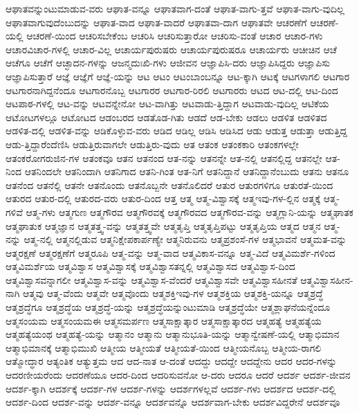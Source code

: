 {ಆಘಾತವನ್ನುಂಟುಮಾಡುವ-ವರು
ಆಘಾತ-ವನ್ನೂ
ಆಘಾತವಾಗ-ದಂತೆ
ಆಘಾತ-ವಾಗು-ತ್ತವೆ
ಆಘಾತ-ವಾಗು-ವುದಿಲ್ಲ
ಆಘಾತವಾಗುವುದೆಂಬುದನ್ನು
ಆಘಾತ-ವಾದ
ಆಘಾತ-ವಾದರೆ
ಆಘಾತವಾ-ದಾಗ
ಆಘಾತವೇ
ಆಚರಣೆಗೆ
ಆಚರಣೆ-ಯಲ್ಲಿ
ಆಚರಣೆ-ಯಿಂದ
ಆಚರಿಸಬೇಕೆಂಬ
ಆಚರಿಸಿ
ಆಚರಿಸುತ್ತಾರೋ
ಆಚರಿಸು-ವಂತೆ
ಆಚಾರ
ಆಚಾರ-ಗಳು
ಆಚಾರವಿಚಾರ-ಗಳಲ್ಲಿ
ಆಚಾರ-ವಿಲ್ಲ
ಆಚಾರ್ಯಪುರುಷರು
ಆಚಾರ್ಯಪುರುಷರೂ
ಆಚಾರ್ಯರು
ಆಚೀಚಿನ
ಆಚೆ
ಆಚೆಗೂ
ಆಚೆಗೆ
ಆಚ್ಛಾದನ-ಗಳನ್ನು
ಆಜನ್ಮದುಃಖಿ-ಗಳು
ಆಜೀವನ
ಆಜ್ಞಾಪಿಸಿ-ದರು
ಆಜ್ಞಾಪಿಸಿದ್ದರು
ಆಜ್ಞಾಪಿಸು
ಆಜ್ಞಾಪಿಸುತ್ತಾರೆ
ಆಜ್ಞೆ
ಆಜ್ಞೆಗೆ
ಆಜ್ಞೆ-ಯನ್ನು
ಆಟ
ಆಟಂ
ಆಟಂಬಾಂಬನ್ನೂ
ಆಟ-ಕ್ಕಾಗಿ
ಆಟಕ್ಕೆ
ಆಟಗಳಾಗಲಿ
ಆಟಗಾರ
ಆಟಗಾರನಾಗಿದ್ದನೆಂದೂ
ಆಟಗಾರನೊಬ್ಬ
ಆಟಗಾರರ
ಆಟಗಾರ-ರಿರಲಿ
ಆಟಗಾರರು
ಆಟದ
ಆಟ-ದಲ್ಲಿ
ಆಟ-ದಿಂದ
ಆಟಪಾಠ-ಗಳಲ್ಲಿ
ಆಟ-ವನ್ನು
ಆಟವನ್ನೇನೋ
ಆಟ-ವಾಗಿತ್ತು
ಆಟವಾಡು-ತ್ತಿದ್ದಾಗ
ಆಟವಾಡು-ವುದಿಲ್ಲ
ಆಟಿಕೆಯ
ಆಟೋಟಗಳಲ್ಲೂ
ಆಟೋಟದ
ಆಡಂಬರದ
ಆಡತೊಡ-ಗಿತು
ಆಡದೆ
ಆಡ-ಬೇಕು
ಆಡಲು
ಆಡಳಿತ
ಆಡಳಿತದ
ಆಡಳಿತ-ದಲ್ಲಿ
ಆಡಳಿತ-ವನ್ನು
ಆಡಿಕೊಳ್ಳುವ-ವರು
ಆಡಿದ
ಆಡಿಲ್ಲ
ಆಡಿಸಿ
ಆಡಿಸಿದ
ಆಡು
ಆಡುತ್ತ
ಆಡುತ್ತಾ
ಆಡುತ್ತಿದ್ದ
ಆಡು-ತ್ತಿದ್ದಾರೆಂದೆಣಿಸಿ
ಆಡುತ್ತಿರುವಾಗಲೇ
ಆಡುತ್ತಿರು-ವುದು
ಆತ
ಆತಂಕ
ಆತಂಕಕಾರಿ
ಆತಂಕಗಳಲ್ಲೇ
ಆತಂಕರೋಗರುಜಿನ-ಗಳ
ಆತಂಕವೂ
ಆತನ
ಆತನಂದ
ಆತ-ನನ್ನು
ಆತನನ್ನೇ
ಆತ-ನಲ್ಲಿ
ಆತನಲ್ಲಿದ್ದ
ಆತನಲ್ಲೇ
ಆತ-ನಿಂದ
ಆತನಿಂದಲೇ
ಆತನಿಂದಾಗಿ
ಆತನಿಗಾದ
ಆತನಿ-ಗಿಂತ
ಆತ-ನಿಗೆ
ಆತನಿದ್ದಾನೆ
ಆತನಿದ್ದಾನೆಂಬುದು
ಆತನು
ಆತನೂ
ಆತನೆಂದ
ಆತನೆಲ್ಲಿ
ಆತನೇ
ಆತನೊಂದು
ಆತನೊಬ್ಬನೇ
ಆತನೊಲಿದರೆ
ಆತುರ
ಆತುರಗಳಿಗೂ
ಆತುರತೆ-ಯಿಂದ
ಆತುರದ
ಆತುರ-ದಲ್ಲಿ
ಆತುರದ-ವರು
ಆತುರ-ದಿಂದ
ಆತ್ತ
ಆತ್ಮ
ಆತ್ಮ-ವಿಶ್ವಾಸಕ್ಕೆ
ಆತ್ಮಇವು-ಗಳ-ಲ್ಲಿನ
ಆತ್ಮಕ್ಕೆ
ಆತ್ಮ-ಗಳಿವೆ
ಆತ್ಮ-ಗಳು
ಆತ್ಮಗುಣ
ಆತ್ಮಗೌರವ
ಆತ್ಮಗೌರವಕ್ಕೆ
ಆತ್ಮಗೌರವದ
ಆತ್ಮಗೌರವ-ವನ್ನು
ಆತ್ಮಗ್ಲಾನಿ-ಯನ್ನು
ಆತ್ಮಘಾತಕ
ಆತ್ಮಘಾತುಕ
ಆತ್ಮಜ್ಞಾನ
ಆತ್ಮತತ್ತ್ವ-ವನ್ನು
ಆತ್ಮತತ್ತ್ವವೇ
ಆತ್ಮತೃಪ್ತಿ
ಆತ್ಮತೃಪ್ತಿಪಟ್ಟು
ಆತ್ಮತೃಪ್ತಿಯ
ಆತ್ಮದ
ಆತ್ಮನ
ಆತ್ಮ-ನನ್ನು
ಆತ್ಮ-ನಲ್ಲಿ
ಆತ್ಮನಲ್ಲಿಡುವ
ಆತ್ಮನಿಕ್ಷೇಪಕಾರ್ಪಣ್ಯೇ
ಆತ್ಮನಿರುವನು
ಆತ್ಮಪ್ರಶಂಸೆ-ಗಳ
ಆತ್ಮಭಾವನೆ
ಆತ್ಮಮತ-ವನ್ನು
ಆತ್ಮರಕ್ಷಣೆ
ಆತ್ಮರಕ್ಷಣೆಗೆ
ಆತ್ಮರೂಪಿ
ಆತ್ಮ-ವನ್ನು
ಆತ್ಮ-ವಾದ
ಆತ್ಮವಿಕಾಸ-ವನ್ನೂ
ಆತ್ಮ-ವಿದೆ
ಆತ್ಮವಿಮರ್ಶೆ-ಗಳಿಂದ
ಆತ್ಮವಿಮರ್ಶೆಯ
ಆತ್ಮವಿಶ್ವಾಸ
ಆತ್ಮವಿಶ್ವಾಸಕ್ಕೆ
ಆತ್ಮವಿಶ್ವಾಸತನ್ನಲ್ಲಿ
ಆತ್ಮವಿಶ್ವಾಸದ
ಆತ್ಮವಿಶ್ವಾಸ-ದಿಂದ
ಆತ್ಮವಿಶ್ವಾಸವನ್ನಾಗಲೀ
ಆತ್ಮವಿಶ್ವಾಸ-ವನ್ನು
ಆತ್ಮವಿಶ್ವಾಸ-ವೆಂದರೆ
ಆತ್ಮವಿಶ್ವಾಸವೇ
ಆತ್ಮವಿಶ್ವಾಸಹೀನತೆ
ಆತ್ಮವಿಶ್ವಾಸಹೀನ-ನಾಗಿ
ಆತ್ಮವು
ಆತ್ಮ-ವೆಂದು
ಆತ್ಮವೇ
ಆತ್ಮವೊಂದು
ಆತ್ಮಶಕ್ತಿಇವು-ಗಳ
ಆತ್ಮಶಕ್ತಿಯ
ಆತ್ಮಶಕ್ತಿ-ಯನ್ನೂ
ಆತ್ಮಶ್ರದ್ಧೆ
ಆತ್ಮಶ್ರದ್ಧೆಗೂ
ಆತ್ಮಶ್ರದ್ಧೆಯ
ಆತ್ಮಶ್ರದ್ಧೆ-ಯನ್ನು
ಆತ್ಮಶ್ರದ್ಧೆಯನ್ನುಂಟುಮಾಡಿ
ಆತ್ಮಶ್ರದ್ಧೆಯೇ
ಆತ್ಮಶ್ಲಾಘನೆಯನ್ನೆಂದೂ
ಆತ್ಮಸಂಯಮ
ಆತ್ಮಸಂಯಮಈ
ಆತ್ಮಸಮರ್ಪಣ
ಆತ್ಮಸಾಕ್ಷಾತ್ಕಾರ
ಆತ್ಮಸಾಕ್ಷಾತ್ಕಾರದ
ಆತ್ಮಹತ್ಯೆ
ಆತ್ಮಹತ್ಯೆಯ
ಆತ್ಮಹತ್ಯೆಯಂಥ
ಆತ್ಮಹತ್ಯೆ-ಯನ್ನು
ಆತ್ಮಾನಂ
ಆತ್ಮಾನು
ಆತ್ಮಾನುಭೂತಿ-ಯನ್ನು
ಆತ್ಮಾನ್ವೇಷಣೆ-ಯಲ್ಲಿ
ಆತ್ಮಾಭಿಮಾನ
ಆತ್ಮಾಭಿಮಾನಕ್ಕೆ
ಆತ್ಮಾಭಿಮುಖಿ
ಆತ್ಮೀಯ
ಆತ್ಮೀಯತೆ
ಆತ್ಮೀಯತೆ-ಯಿಂದ
ಆತ್ಮೀಯನೊಬ್ಬ
ಆತ್ಮೀಯ-ರಾಗಲಿ
ಆತ್ಮೋದ್ಧಾರ
ಆತ್ಯಂತಿಕ
ಆತ್ಯುತ್ತಮ
ಆದ
ಆದ-ನಾತ
ಆ-ದಂತೆ
ಆದದ್ದು
ಆದದ್ದೇ
ಆದದ್ದೇನು
ಆದರ
ಆದರ-ಗಳನ್ನು
ಆದರಣೀಯರೆಂದು
ಆದರಣೆಯೂ
ಆದರ-ದಿಂದ
ಆದರಿಸುವನೋ
ಆ-ದರು
ಆದರೂ
ಆದರೆ
ಆದರ್ಶ
ಆದರ್ಶ-ಜೀವನ
ಆದರ್ಶ-ಕ್ಕಾಗಿ
ಆದರ್ಶಕ್ಕೆ
ಆದರ್ಶ-ಗಳ
ಆದರ್ಶ-ಗಳನ್ನು
ಆದರ್ಶಗಳಲ್ಲವೆ
ಆದರ್ಶ-ಗಳು
ಆದರ್ಶದ
ಆದರ್ಶ-ದಲ್ಲಿ
ಆದರ್ಶ-ದಿಂದ
ಆದರ್ಶ-ವನ್ನು
ಆದರ್ಶ-ವನ್ನೂ
ಆದರ್ಶವನ್ನೊ
ಆದರ್ಶವಾಗ-ಬೇಕು
ಆದರ್ಶವಿದ್ದರೇನೆ
ಆದರ್ಶವೂ
}
